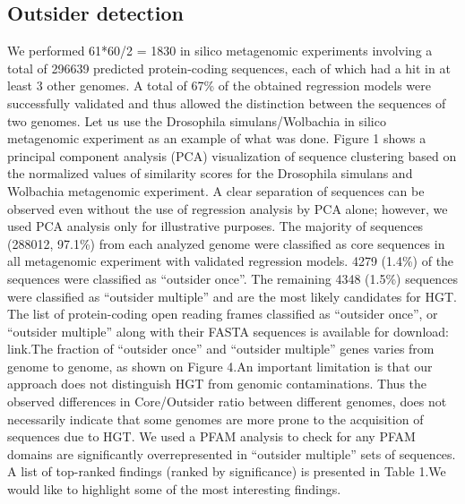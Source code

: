 \subsection{Outsider detection}
We performed 61*60/2 = 1830 in silico metagenomic experiments involving a total
of 296639 predicted protein-coding sequences, each of which had a hit in at
least 3 other genomes. A total of 67\% of the obtained regression models were successfully validated and thus allowed the distinction between the sequences of two genomes.
Let us use the Drosophila simulans/Wolbachia in silico metagenomic experiment as an example of what was done.
Figure 1 shows a principal component analysis (PCA) visualization of sequence clustering based on the normalized values of similarity scores for the Drosophila simulans and Wolbachia metagenomic experiment. A clear separation of sequences can be observed even without the use of regression analysis by PCA alone; however, we used PCA analysis only for illustrative purposes.
The majority of sequences (288012, 97.1\%) from each analyzed genome were
classified as core sequences in all metagenomic experiment with validated
regression models. 4279 (1.4\%) of the sequences were classified as “outsider
once”. The remaining 4348 (1.5\%) sequences were classified as “outsider
multiple” and are the most likely candidates for HGT. The list of
protein-coding open reading frames classified as “outsider once”, or “outsider
multiple” along with their FASTA sequences is available for download: link.The
fraction of “outsider once” and “outsider multiple” genes varies from genome to
genome, as shown on Figure 4.An important limitation is that our approach does not distinguish HGT from genomic contaminations. Thus the observed differences in Core/Outsider ratio between different genomes, does not necessarily indicate that some genomes are more prone to the acquisition of sequences due to HGT.
We used a PFAM analysis to check for any PFAM domains are significantly
overrepresented in “outsider multiple” sets of sequences. A list of top-ranked
findings (ranked by significance) is presented in Table 1.We would like to
highlight some of the most interesting findings.
